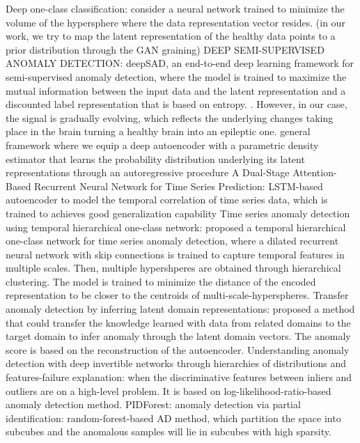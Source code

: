 \documentclass{article}
\begin{document}
	\cite{ruff2018deep}%
	Deep one-class classification: consider a neural network trained to minimize the volume of the hypersphere where the data representation vector resides. (in our work, we try to map the latent representation of the healthy data points to a prior distribution through the GAN graining)
	\cite{ruff2019deep} DEEP SEMI-SUPERVISED ANOMALY DETECTION: deepSAD, an end-to-end deep learning framework for semi-supervised anomaly detection, where the model is trained to maximize the mutual information between the input data and the latent representation and a discounted label representation that is based on entropy. 
	\cite{adams1995hitchhiker}. However, in our case, the signal is gradually evolving, which reflects the underlying changes taking place in the brain turning a healthy brain into an epileptic one. 
	\cite{abati2019latent} general framework where we equip a deep autoencoder with a parametric density estimator that learns the probability distribution underlying its latent representations through an autoregressive procedure
	\cite{qin2017dual} A Dual-Stage Attention-Based Recurrent Neural Network for Time Series Prediction: LSTM-based autoencoder to model the temporal correlation of time series data, which is trained to achieves good generalization capability
	\cite{shen2020timeseries} Time series anomaly detection using temporal hierarchical one-class network: proposed a temporal hierarchical one-class network for time series anomaly detection, where a dilated recurrent neural network with skip connections is trained to capture temporal features in multiple scales. Then, multiple hypershperes are obtained through hierarchical clustering. The model is trained to minimize the distance of the encoded representation to be closer to the centroids of multi-scale-hyperspheres.
	\cite{kumagai2019transfer} Transfer anomaly detection by inferring latent domain representations: proposed a method that could transfer the knowledge learned with data from related domains to the target domain to infer anomaly through the latent domain vectors. The anomaly score is based on the reconstruction of the autoencoder.
	\cite{schirrmeister2020understanding} Understanding anomaly detection with deep invertible networks through hierarchies of distributions and features-failure explanation: when the discriminative features between inliers and outliers are on a high-level problem. It is based on log-likelihood-ratio-based anomaly detection method.
	\cite{gopalan2019pidforest} PIDForest: anomaly detection via partial identification: random-forest-based AD method, which partition the space into subcubes and the anomalous samples will lie in subcubes with high sparsity.
\end{document}
